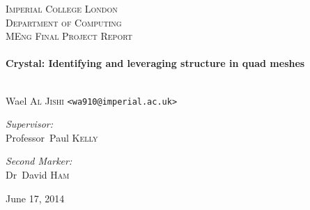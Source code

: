 \begin{titlepage}
\begin{center}

\null
\vspace{4cm}

\textsc{\LARGE Imperial College London\\\vspace{0.3 em}Department of Computing}\\[1.5cm]

\textsc{\Large MEng Final Project Report}\\[0.5cm]

\HRule \\[0.4cm]
{ \LARGE \bfseries Crystal: Identifying and leveraging structure in quad meshes \\[0.4cm] }

\HRule \\[1.5cm]




{\large Wael \textsc{Al Jishi} \texttt{<wa910@imperial.ac.uk>}}
\vspace{0.7 cm}

\begin{minipage}{0.4\textwidth}
\begin{flushleft} \large
\emph{Supervisor:} \\
Professor~Paul \textsc{Kelly}
\end{flushleft}
\end{minipage}
\begin{minipage}{0.4\textwidth}
\begin{flushright} \large
\emph{Second Marker:} \\
Dr~David \textsc{Ham}
\end{flushright}
\end{minipage}

\vfill

{\large June 17, 2014}

\end{center}
\end{titlepage}
